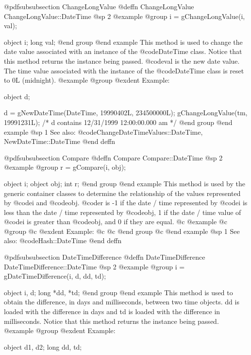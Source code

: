 @pdfsubsubsection {ChangeLongValue}
@deffn {ChangeLongValue} ChangeLongValue::DateTime
@sp 2
@example
@group
i = gChangeLongValue(i, val);

object  i;
long    val;
@end group
@end example
This method is used to change the date value associated with an 
instance of the @code{DateTime} class.  Notice that this method
returns the instance being passed.  @code{val} is the new date value.
The time value associated with the instance of the @code{DateTime}
class is reset to 0L (midnight).
@example
@group
@exdent Example:

object  d;

d = gNewDateTime(DateTime, 19990402L, 234500000L);
gChangeLongValue(tm, 19991231L);
/*  d contains 12/31/1999 12:00:00.000 am  */
@end group
@end example
@sp 1
See also:  @code{ChangeDateTimeValues::DateTime, NewDateTime::DateTime}
@end deffn










@pdfsubsubsection {Compare}
@deffn {Compare} Compare::DateTime
@sp 2
@example
@group
r = gCompare(i, obj);

object  i;
object  obj;
int     r;
@end group
@end example
This method is used by the generic container classes to determine
the relationship of the values represented by @code{i} and @code{obj}. 
@code{r} is -1 if the date / time represented by @code{i} is less than
the date / time represented by @code{obj}, 1 if the date / time value of
@code{i} is greater than @code{obj}, and 0 if they are equal.
@c @example
@c @group
@c @exdent Example:
@c
@c @end group
@c @end example
@sp 1
See also:  @code{Hash::DateTime}
@end deffn







@pdfsubsubsection {DateTimeDifference}
@deffn {DateTimeDifference} DateTimeDifference::DateTime
@sp 2
@example
@group
i = gDateTimeDifference(i, d, dd, td);

object  i, d;
long    *dd, *td;
@end group
@end example
This method is used to obtain the difference, in days and milliseconds,
between two time objects.  dd is loaded with the difference in days
and td is loaded with the difference in milliseconds.  Notice that this
method returns the instance being passed.  
@example
@group
@exdent Example:

object  d1, d2;
long    dd, td;

